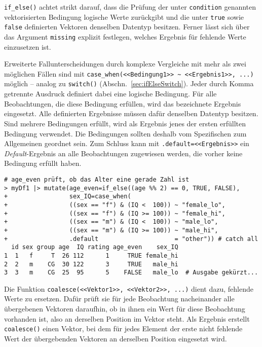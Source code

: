 \lstinline!if_else()! achtet strikt darauf, dass die Prüfung der unter \lstinline!condition! genannten vektorisierten Bedingung logische Werte zurückgibt und die unter \lstinline!true! sowie \lstinline!false! definierten Vektoren denselben Datentyp besitzen. Ferner lässt sich über das Argument \lstinline!missing! explizit festlegen, welches Ergebnis für fehlende Werte einzusetzen ist.

Erweiterte Fallunterscheidungen durch komplexe Vergleiche mit mehr als zwei möglichen Fällen sind mit \lstinline!case_when(<<Bedingung1>> ~ <<Ergebnis1>>, ...)! möglich -- analog zu \lstinline!switch()! (Abschn.\ \ref{sec:ifElseSwitch}). Jeder durch Komma getrennte Ausdruck definiert dabei eine logische Bedingung. Für alle Beobachtungen, die diese Bedingung erfüllen, wird das bezeichnete Ergebnis eingesetzt. Alle definierten Ergebnisse müssen dafür denselben Datentyp besitzen. Sind mehrere Bedingungen erfüllt, wird als Ergebnis jenes der ersten erfüllten Bedingung verwendet. Die Bedingungen sollten deshalb vom Spezifischen zum Allgemeinen geordnet sein. Zum Schluss kann mit \lstinline!.default=<<Ergebnis>>! ein \emph{Default}-Ergebnis an alle Beobachtungen zugewiesen werden, die vorher keine Bedingung erfüllt haben.
\begin{lstlisting}
# age_even prüft, ob das Alter eine gerade Zahl ist
> myDf1 |> mutate(age_even=if_else((age %% 2) == 0, TRUE, FALSE),
+                 sex_IQ=case_when(
+                 ((sex == "f") & (IQ <  100)) ~ "female_lo",
+                 ((sex == "f") & (IQ >= 100)) ~ "female_hi",
+                 ((sex == "m") & (IQ <  100)) ~ "male_lo",
+                 ((sex == "m") & (IQ >= 100)) ~ "male_hi",
+                 .default                     = "other")) # catch all
  id sex group age  IQ rating age_even    sex_IQ
1  1   f     T  26 112      1     TRUE female_hi
2  2   m    CG  30 122      3     TRUE   male_hi
3  3   m    CG  25  95      5    FALSE   male_lo  # Ausgabe gekürzt...
\end{lstlisting}

Die Funktion \lstinline!coalesce(<<Vektor1>>, <<Vektor2>>, ...)! dient dazu, fehlende Werte zu ersetzen. Dafür prüft sie für jede Beobachtung nacheinander alle übergebenen Vektoren daraufhin, ob in ihnen ein Wert für diese Beobachtung vorhanden ist, also an derselben Position im Vektor steht. Als Ergebnis erstellt \lstinline!coalesce()! einen Vektor, bei dem für jedes Element der erste nicht fehlende Wert der übergebenden Vektoren an derselben Position eingesetzt wird.

